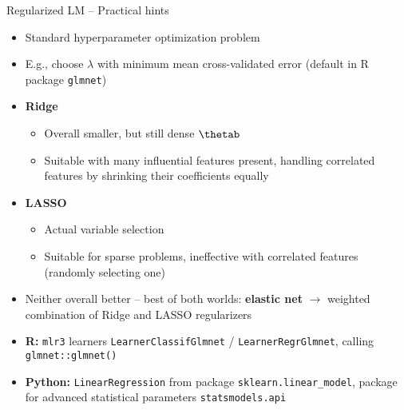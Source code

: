 
\begin{frame}{Regularized LM -- Practical hints}


\begin{itemize}
  \item Standard hyperparameter optimization problem
  \item E.g., choose $\lambda$ with minimum mean cross-validated error 
  (default in R package \texttt{glmnet})
\end{itemize}

\medskip


\begin{itemize}
  \item \textbf{Ridge}
  \begin{itemize} \footnotesize
    \item Overall smaller, but still dense $\thetab$
    \item Suitable with many influential features present, handling correlated 
    features by shrinking their coefficients equally
  \end{itemize}
  \item \textbf{LASSO}
  \begin{itemize} \footnotesize
    \item Actual variable selection
    \item Suitable for sparse problems, ineffective with correlated 
    features (randomly selecting one)
  \end{itemize}  
  \item Neither overall better -- best of both worlds: \textbf{elastic net} 
  $\rightarrow$ weighted 
  combination of Ridge and LASSO regularizers
\end{itemize}

\medskip


\begin{itemize}
    \item \textbf{R:} \texttt{mlr3} learners \texttt{LearnerClassifGlmnet} / 
    \texttt{LearnerRegrGlmnet}, calling \texttt{glmnet::glmnet()}
    \item \textbf{Python:} \texttt{LinearRegression} from package 
    \texttt{sklearn.linear\_model}, package for advanced statistical parameters 
    \texttt{statsmodels.api} 
  \end{itemize}

\end{frame}